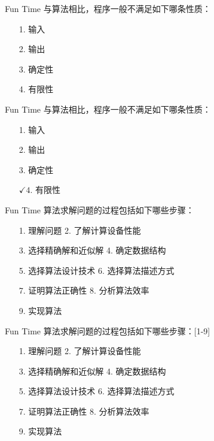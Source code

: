 \documentclass[fontset=fandol,UTF8,12pt,aspectratio=169,fleqn]{beamer}
\begin{document}
\begin{frame}{Fun Time}
与算法相比，程序一般不满足如下哪条性质：

\begin{itemize}[]
\item[1.] 输入
\item[2.] 输出
\item[3.] 确定性
\item[4.] 有限性
\end{itemize}
\end{frame}

\begin{frame}{Fun Time}
与算法相比，程序一般不满足如下哪条性质：
\begin{itemize}[]
\item[1.] 输入
\item[2.] 输出
\item[3.] 确定性
\item[$\checkmark{4.}$] 有限性 
\end{itemize}
\end{frame}

\begin{frame}{Fun Time}
算法求解问题的过程包括如下哪些步骤：
\begin{itemize}[]
\item[1.] 理解问题 \hspace{3cm} 2. 了解计算设备性能
\item[3.] 选择精确解和近似解 \hspace{1.1cm} 4. 确定数据结构
\item[5.] 选择算法设计技术 \hspace{1.5cm} 6. 选择算法描述方式
\item[7.] 证明算法正确性 \hspace{1.9cm} 8. 分析算法效率
\item[9.] 实现算法 
\end{itemize}
\end{frame}

\begin{frame}{Fun Time}
  算法求解问题的过程包括如下哪些步骤：[1-9]
  \begin{itemize}[]
\item[1.] 理解问题 \hspace{3cm} 2. 了解计算设备性能
\item[3.] 选择精确解和近似解 \hspace{1.1cm} 4. 确定数据结构
\item[5.] 选择算法设计技术 \hspace{1.5cm} 6. 选择算法描述方式
\item[7.] 证明算法正确性 \hspace{1.9cm} 8. 分析算法效率
\item[9.] 实现算法 
\end{itemize}
\end{frame}
\end{document}
